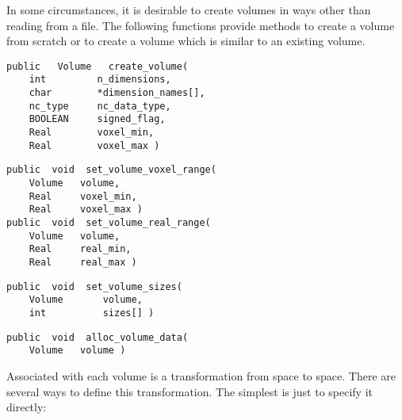 In some circumstances, it is desirable to create volumes in ways
other than reading from a file.  The following functions provide
methods to create a volume from scratch or to create a volume which is
similar to an existing volume.

{\bf\begin{verbatim}
public   Volume   create_volume(
    int         n_dimensions,
    char        *dimension_names[],
    nc_type     nc_data_type,
    BOOLEAN     signed_flag,
    Real        voxel_min,
    Real        voxel_max )
\end{verbatim}}


{\bf\begin{verbatim}
public  void  set_volume_voxel_range(
    Volume   volume,
    Real     voxel_min,
    Real     voxel_max )
public  void  set_volume_real_range(
    Volume   volume,
    Real     real_min,
    Real     real_max )
\end{verbatim}}


{\bf\begin{verbatim}
public  void  set_volume_sizes(
    Volume       volume,
    int          sizes[] )
\end{verbatim}}


{\bf\begin{verbatim}
public  void  alloc_volume_data(
    Volume   volume )
\end{verbatim}}


Associated with each volume is a transformation from 
space to  space.  There are several ways to define this
transformation.  The simplest is just to specify it directly:

